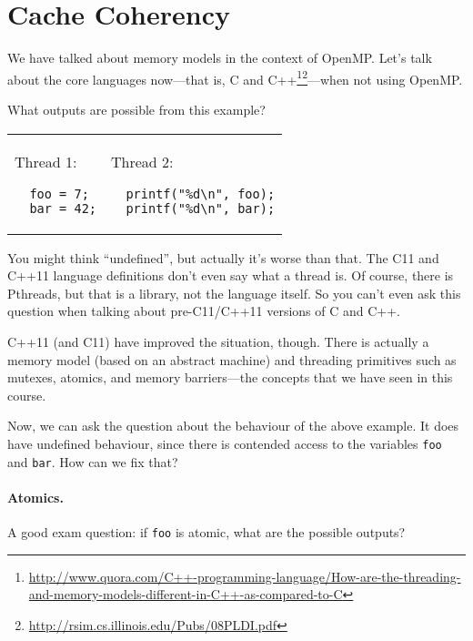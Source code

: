 




\section*{Cache Coherency}

We have talked about memory models in the context of OpenMP. Let's
talk about the core languages now---that is, C and C++\footnote{\url{http://www.quora.com/C++-programming-language/How-are-the-threading-and-memory-models-different-in-C++-as-compared-to-C}}\footnote{\url{http://rsim.cs.illinois.edu/Pubs/08PLDI.pdf}}---when
not using OpenMP.

What outputs are possible from this example?

\begin{tabular}{ll}
      \begin{minipage}{.2\textwidth}
        Thread 1:
        \begin{verbatim}
  foo = 7;
  bar = 42;
        \end{verbatim}
      \end{minipage} &
      \begin{minipage}{.4\textwidth}
        Thread 2:
        \begin{verbatim}
  printf("%d\n", foo);
  printf("%d\n", bar);
        \end{verbatim}
      \end{minipage}
\end{tabular}

You might think ``undefined'', but actually it's worse than that. The 
C11 and C++11 language definitions don't even say what a thread is.
Of course, there is Pthreads, but that is a library, not the language itself.
So you can't even ask this question when talking about pre-C11/C++11 versions
of C and C++.

C++11 (and C11) have improved the situation, though. There is actually
a memory model (based on an abstract machine) and threading primitives
such as mutexes, atomics, and memory barriers---the concepts that we
have seen in this course.

Now, we can ask the question about the behaviour of the above example.
It does have undefined behaviour, since there is contended access to
the variables {\tt foo} and {\tt bar}. How can we fix that?

\paragraph{Atomics.}
A good exam question: if {\tt foo} is atomic, what are the possible outputs? 
    
